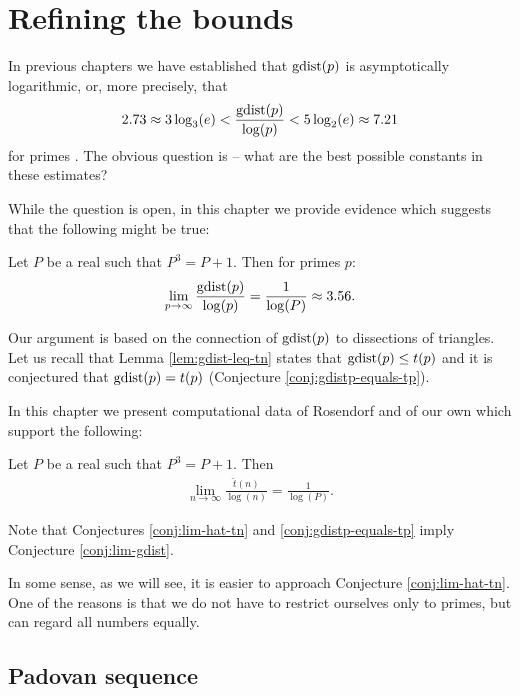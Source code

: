 \chapter{Refining the bounds}

In previous chapters we have established that $\mathop{\mathrm{gdist}}(p)$ is asymptotically logarithmic, or, more precisely, that
\begin{align}
	2.73 \approx 3 \log_3(e) < \frac{\mathop{\mathrm{gdist}}(p)}{\log(p)} < 5 \log_2(e) \approx 7.21
\end{align}
for primes . The obvious question is -- what are the best possible constants in these estimates?

While the question is open, in this chapter we provide evidence which suggests that the following might be true:

\begin{conj}
\label{conj:lim-gdist}
Let $P$ be a real such that $P^3=P+1$. Then for primes $p$:
\begin{align}
	\lim_{p \rightarrow \infty} \frac{\mathop{\mathrm{gdist}}(p)}{\log(p)} = \frac{1}{\log(P)} \approx 3.56.
\end{align}
\end{conj}%

Our argument is based on the connection of $\mathop{\mathrm{gdist}}(p)$ to dissections of triangles. Let us recall that Lemma \ref{lem:gdist-leq-tn} states that $\mathop{\mathrm{gdist}}(p) \leq t(p)$ and it is conjectured that $\mathop{\mathrm{gdist}}(p) = t(p)$ (Conjecture \ref{conj:gdistp-equals-tp}).

In this chapter we present computational data of Rosendorf \cite{Rosendorf04} and of our own which support the following:

\begin{conj}
\label{conj:lim-hat-tn}
Let $P$ be a real such that $P^3=P+1$. Then
\begin{align}
	\lim_{n \rightarrow \infty} \frac{\hat t(n)}{\log(n)} = \frac{1}{\log(P)}.
\end{align}
\end{conj}%

Note that Conjectures \ref{conj:lim-hat-tn} and \ref{conj:gdistp-equals-tp} imply Conjecture \ref{conj:lim-gdist}.

In some sense, as we will see, it is easier to approach Conjecture \ref{conj:lim-hat-tn}. One of the reasons is that we do not have to restrict ourselves only to primes, but can regard all numbers equally.

\section{Padovan sequence}

